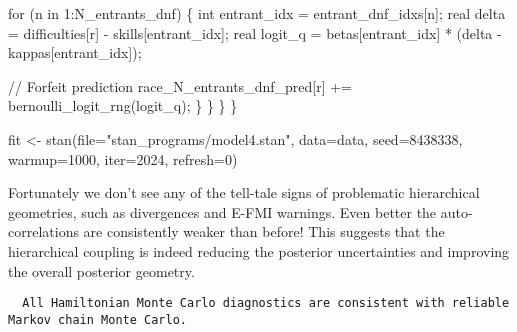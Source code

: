\documentclass[
  letterpaper,
  DIV=11,
  numbers=noendperiod]{scrartcl}
\newenvironment{Shaded}{\begin{snugshade}}{\end{snugshade}}
\newcommand{\AttributeTok}[1]{\textcolor[rgb]{0.40,0.45,0.13}{#1}}
\newcommand{\CommentTok}[1]{\textcolor[rgb]{0.37,0.37,0.37}{#1}}
\newcommand{\ControlFlowTok}[1]{\textcolor[rgb]{0.00,0.23,0.31}{#1}}
\newcommand{\DataTypeTok}[1]{\textcolor[rgb]{0.68,0.00,0.00}{#1}}
\newcommand{\DecValTok}[1]{\textcolor[rgb]{0.68,0.00,0.00}{#1}}
\newcommand{\FunctionTok}[1]{\textcolor[rgb]{0.28,0.35,0.67}{#1}}
\newcommand{\NormalTok}[1]{\textcolor[rgb]{0.00,0.23,0.31}{#1}}
\newcommand{\OtherTok}[1]{\textcolor[rgb]{0.00,0.23,0.31}{#1}}
\newcommand{\SpecialCharTok}[1]{\textcolor[rgb]{0.37,0.37,0.37}{#1}}
\newcommand{\StringTok}[1]{\textcolor[rgb]{0.13,0.47,0.30}{#1}}
\begin{document}
\begin{codelisting}
\begin{Shaded}
\begin{Highlighting}[]
      \ControlFlowTok{for}\NormalTok{ (n }\ControlFlowTok{in} \DecValTok{1}\NormalTok{:N\_entrants\_dnf) \{}
        \DataTypeTok{int}\NormalTok{ entrant\_idx = entrant\_dnf\_idxs[n];}
        \DataTypeTok{real}\NormalTok{ delta = difficulties[r] {-} skills[entrant\_idx];}
        \DataTypeTok{real}\NormalTok{ logit\_q = betas[entrant\_idx] * (delta {-} kappas[entrant\_idx]);}

        \CommentTok{// Forfeit prediction}
\NormalTok{        race\_N\_entrants\_dnf\_pred[r] += bernoulli\_logit\_rng(logit\_q);}
\NormalTok{      \}}
\NormalTok{    \}}
\NormalTok{  \}}
\NormalTok{\}}
\end{Highlighting}
\end{Shaded}

\end{codelisting}

\begin{Shaded}
\begin{Highlighting}[]
\NormalTok{fit }\OtherTok{\textless{}{-}} \FunctionTok{stan}\NormalTok{(}\AttributeTok{file=}\StringTok{"stan\_programs/model4.stan"}\NormalTok{,}
            \AttributeTok{data=}\NormalTok{data, }\AttributeTok{seed=}\DecValTok{8438338}\NormalTok{,}
            \AttributeTok{warmup=}\DecValTok{1000}\NormalTok{, }\AttributeTok{iter=}\DecValTok{2024}\NormalTok{, }\AttributeTok{refresh=}\DecValTok{0}\NormalTok{)}
\end{Highlighting}
\end{Shaded}

Fortunately we don't see any of the tell-tale signs of problematic
hierarchical geometries, such as divergences and E-FMI warnings. Even
better the auto-correlations are consistently weaker than before! This
suggests that the hierarchical coupling is indeed reducing the posterior
uncertainties and improving the overall posterior geometry.

\begin{Shaded}
\end{Shaded}

\begin{verbatim}
  All Hamiltonian Monte Carlo diagnostics are consistent with reliable
Markov chain Monte Carlo.
\end{verbatim}
\end{document}
